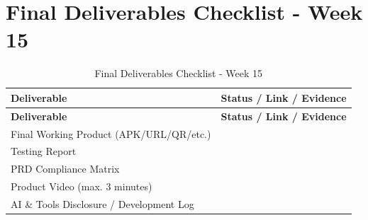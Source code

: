 \chapter{Final Deliverables Checklist - Week 15}
\label{bab:final-deliverables-checklist-week-15}
\begin{longtable}{|L{0.500}|L{0.500}|}
\caption{Final Deliverables Checklist - Week 15}\\
\hline
{}\textbf{Deliverable} & \textbf{Status / Link / Evidence} \\ \hline
\endfirsthead
\hline
{}\textbf{Deliverable} & \textbf{Status / Link / Evidence} \\ \hline
\endhead
Final Working Product (APK/URL/QR/etc.) &  \\ \hline
Testing Report &  \\ \hline
PRD Compliance Matrix &  \\ \hline
Product Video (max. 3 minutes) &  \\ \hline
AI \& Tools Disclosure / Development Log &  \\ \hline
\end{longtable}
